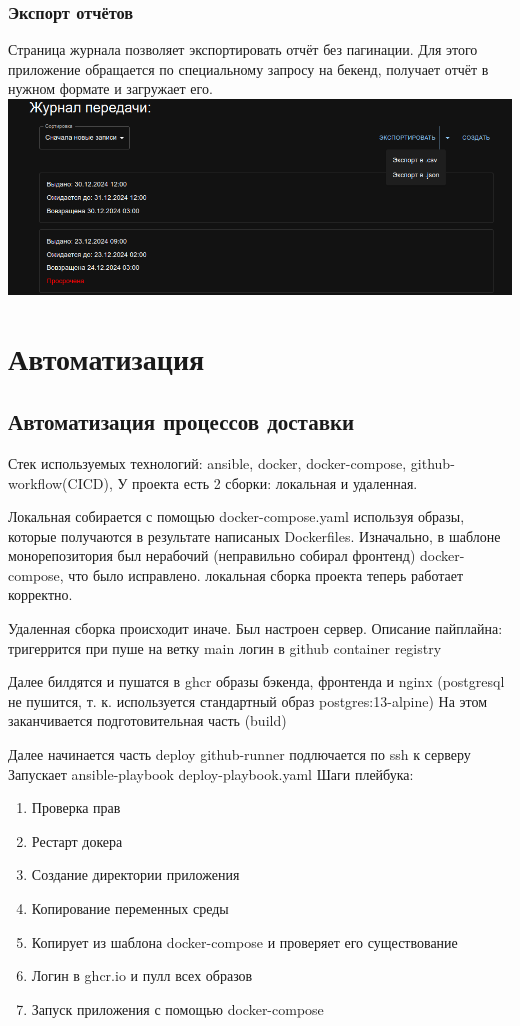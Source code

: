 \documentclass[a4paper,14pt]{extarticle}
\begin{document}
\subsubsection{Экспорт отчётов}
Страница журнала позволяет экспортировать отчёт без пагинации. Для этого приложение
обращается по специальному запросу на бекенд, получает отчёт в нужном формате и загружает его.\\
\includegraphics[width=140mm]{export.png}

\section{Автоматизация}
\subsection{Автоматизация процессов доставки}
Стек используемых технологий: ansible, docker, docker-compose, github-workflow(CICD), 
У проекта есть 2 сборки: локальная и удаленная. 

Локальная собирается с помощью docker-compose.yaml используя образы, 
которые получаются в результате написаных Dockerfiles. 
Изначально, в шаблоне монорепозитория был нерабочий (неправильно собирал фронтенд) docker-compose, 
что было исправлено. локальная сборка проекта теперь работает корректно.

Удаленная сборка происходит иначе.
Был настроен сервер. Описание пайплайна:
тригеррится при пуше на ветку main
логин в github container registry

Далее билдятся и пушатся в ghcr образы бэкенда, фронтенда и nginx (postgresql не пушится, т. к. используется стандартный образ postgres:13-alpine)
На этом заканчивается подготовительная часть (build)

Далее начинается часть deploy
github-runner подлючается по ssh к серверу
Запускает ansible-playbook deploy-playbook.yaml
Шаги плейбука:
\begin{enumerate}
  \item Проверка прав 
  \item Рестарт докера 
  \item Создание директории приложения
  \item Копирование переменных среды
  \item Копирует из шаблона docker-compose и проверяет его существование
  \item Логин в ghcr.io и пулл всех образов
  \item Запуск приложения с помощью docker-compose
\end{enumerate}
\end{document}
